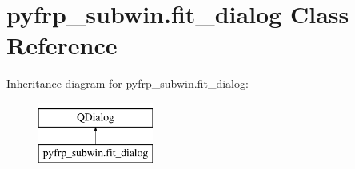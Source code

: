 \hypertarget{classpyfrp__subwin_1_1fit__dialog}{\section{pyfrp\+\_\+subwin.\+fit\+\_\+dialog Class Reference}
\label{classpyfrp__subwin_1_1fit__dialog}
}
Inheritance diagram for pyfrp\+\_\+subwin.\+fit\+\_\+dialog\+:\begin{figure}[H]
\begin{center}
\leavevmode
\includegraphics[height=2.000000cm]{classpyfrp__subwin_1_1fit__dialog}
\end{center}
\end{figure}
